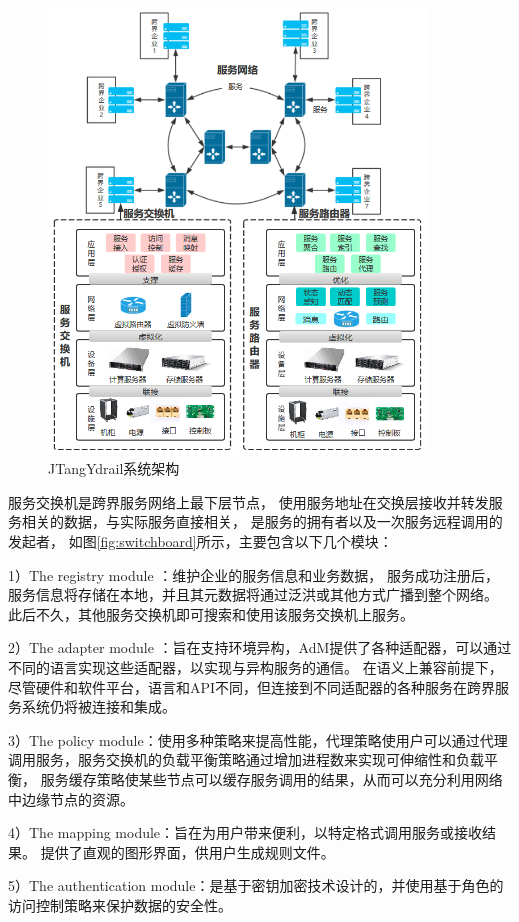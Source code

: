   \begin{figure}[htbp]
    \centering
    \includegraphics[width=10cm]{./images/system.png}
    \caption{JTangYdrail系统架构}
    \label{fig:system}
  \end{figure}

  服务交换机是跨界服务网络上最下层节点，
  使用服务地址在交换层接收并转发服务相关的数据，与实际服务直接相关，
  是服务的拥有者以及一次服务远程调用的发起者，
如图\ref{fig:switchboard}所示，主要包含以下几个模块：

1）The registry module ：维护企业的服务信息和业务数据，
服务成功注册后，服务信息将存储在本地，并且其元数据将通过泛洪或其他方式广播到整个网络。
此后不久，其他服务交换机即可搜索和使用该服务交换机上服务。

2）The adapter module ：旨在支持环境异构，AdM提供了各种适配器，可以通过不同的语言实现这些适配器，以实现与异构服务的通信。
在语义上兼容前提下，尽管硬件和软件平台，语言和API不同，但连接到不同适配器的各种服务在跨界服务系统仍将被连接和集成。

3）The policy module：使用多种策略来提高性能，代理策略使用户可以通过代理调用服务，服务交换机的负载平衡策略通过增加进程数来实现可伸缩性和负载平衡，
服务缓存策略使某些节点可以缓存服务调用的结果，从而可以充分利用网络中边缘节点的资源。 

4）The mapping module：旨在为用户带来便利，以特定格式调用服务或接收结果。
 提供了直观的图形界面，供用户生成规则文件。 
 
5）The authentication module：是基于密钥加密技术设计的，并使用基于角色的访问控制策略来保护数据的安全性。

